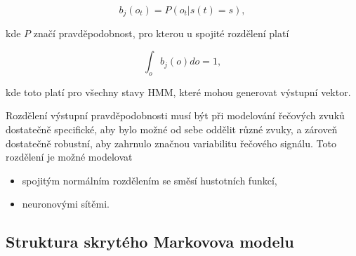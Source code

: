 \begin{equation}
  b_j\left(o_t\right) = P\left(o_t|s\left(t\right)=s\right),
  \label{eq:asr:acoustic:state:output}
\end{equation}

\noindent kde $P$ značí pravděpodobnost, pro kterou u spojité rozdělení platí

\begin{equation}
  \int_o b_j\left(o\right)do = 1,
  \label{eq:asr:acoustic:state:output:condition:continous}
\end{equation}

\noindent kde toto platí pro všechny stavy HMM, které mohou generovat výstupní vektor.






Rozdělení výstupní pravděpodobnosti musí být při modelování řečových zvuků dostatečně specifické, aby bylo možné od sebe oddělit různé zvuky, a zároveň dostatečně robustní, aby zahrnulo značnou variabilitu řečového signálu. Toto rozdělení je možné modelovat

\begin{itemize}
  \item spojitým normálním rozdělením se směsí hustotních funkcí,
  \item neuronovými sítěmi.
\end{itemize}

\subsection{Struktura skrytého Markovova modelu}
\label{chap:asr:acoustic:HMM}

